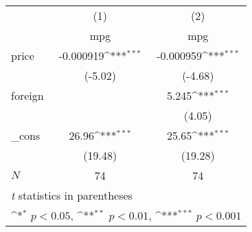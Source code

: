 {
\def\sym#1{\ifmmode^{#1}\else\(^{#1}\)\fi}
\begin{tabular}{l*{2}{c}}
\hline\hline
            &\multicolumn{1}{c}{(1)}&\multicolumn{1}{c}{(2)}\\
            &\multicolumn{1}{c}{mpg}&\multicolumn{1}{c}{mpg}\\
\hline
price       &   -0.000919\sym{***}&   -0.000959\sym{***}\\
            &     (-5.02)         &     (-4.68)         \\
[1em]
foreign     &                     &       5.245\sym{***}\\
            &                     &      (4.05)         \\
[1em]
\_cons      &       26.96\sym{***}&       25.65\sym{***}\\
            &     (19.48)         &     (19.28)         \\
\hline
\(N\)       &          74         &          74         \\
\hline\hline
\multicolumn{3}{l}{\footnotesize \textit{t} statistics in parentheses}\\
\multicolumn{3}{l}{\footnotesize \sym{*} \(p<0.05\), \sym{**} \(p<0.01\), \sym{***} \(p<0.001\)}\\
\end{tabular}
}
